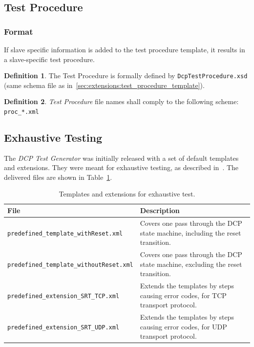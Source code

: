 \documentclass[a4paper]{scrartcl}
\theoremstyle{definition}
\newtheorem*{Def}{Definition}
\begin{document}
\subsection{Test Procedure }
\label{sec:extensions:test_procedure_extension}

\subsubsection{Format}
If slave specific information is added to the test procedure template, it results in a slave-specific test procedure.

\begin{Def}
The Test Procedure is formally defined by \texttt{DcpTestProcedure.xsd} (same schema file as in~\ref{sec:extensions:test_procedure_template}).
\end{Def}

\begin{Def}
\textit{Test Procedure} file names shall comply to the following scheme: \texttt{proc\_*.xml}
\end{Def}

\subsection{Exhaustive Testing}
\label{sec:exhaustive}
The \textit{DCP Test Generator} was initially released with a set of default templates and extensions.
They were meant for exhaustive testing, as described in~\cite{Krammer2020}.
The delivered files are shown in Table~\ref{tab:TemplatesAndExtensionsForExhaustiveTest}.

\begin{table}[H]
\footnotesize
	\centering
		\begin{tabular}{lp{8cm}}
			File	&	Description	\\ \hline
			\texttt{predefined\_template\_withReset.xml}	&	Covers one pass through the DCP state machine, including the reset transition.\\
			\texttt{predefined\_template\_withoutReset.xml}	&	Covers one pass through the DCP state machine, excluding the reset transition.\\
			\texttt{predefined\_extension\_SRT\_TCP.xml}	&	Extends the templates by steps causing error codes, for TCP transport protocol.\\
			\texttt{predefined\_extension\_SRT\_UDP.xml}	&	Extends the templates by steps causing error codes, for UDP transport protocol.\\ \hline
		\end{tabular}
	\caption{Templates and extensions for exhaustive test.}
	\label{tab:TemplatesAndExtensionsForExhaustiveTest}
\end{table}
\end{document}
